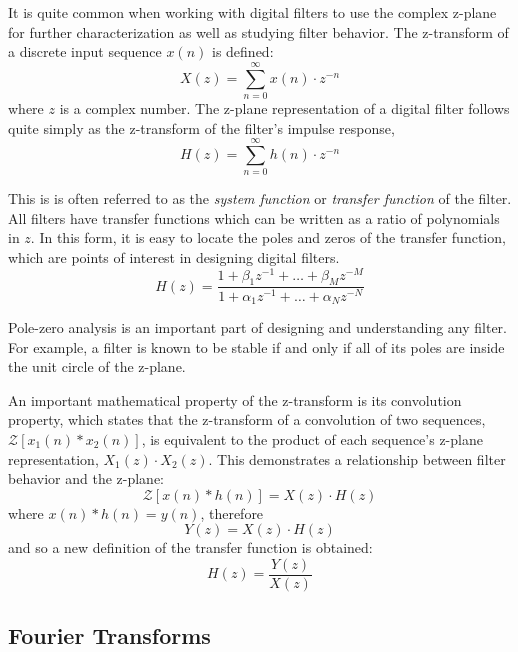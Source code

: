 \documentclass[reprint,amsmath,amssymb,aps,pra]{revtex4-2}
\begin{document}
It is quite common when working with digital filters to use the complex z-plane for further characterization as well as studying filter behavior. The z-transform of a discrete input sequence $x(n)$ is defined:
\begin{equation}
    X(z) = \sum_{n=0}^\infty x(n)\cdot z^{-n}
\end{equation}
where $z$ is a complex number. The z-plane representation of a digital filter follows quite simply as the z-transform of the filter's impulse response,
\begin{equation}
    H(z) = \sum_{n=0}^\infty h(n)\cdot z^{-n}
\end{equation}

This is is often referred to as the \textit{system function} or \textit{transfer function} of the filter. All filters have transfer functions which can be written as a ratio of polynomials in $z$. In this form, it is easy to locate the poles and zeros of the transfer function, which are points of interest in designing digital filters.
\begin{equation}
    H(z) = \frac{1+\beta_1z^{-1} + \ldots + \beta_Mz^{-M}}{1+\alpha_1z^{-1} + \ldots + \alpha_Nz^{-N}}
\end{equation}

Pole-zero analysis is an important part of designing and understanding any filter. For example, a filter is known to be stable if and only if all of its poles are inside the unit circle of the z-plane.

An important mathematical property of the z-transform is its convolution property, which states that the z-transform of a convolution of two sequences, $\mathcal{Z}\left[x_1(n)*x_2(n)\right]$, is equivalent to the product of each sequence's z-plane representation, $X_1(z)\cdot X_2(z)$. This demonstrates a relationship between filter behavior and the z-plane:
\begin{equation}
    \mathcal{Z}[x(n)*h(n)] = X(z)\cdot H(z) \nonumber
\end{equation}
where $x(n) * h(n) = y(n)$, therefore
\begin{equation}
    Y(z) = X(z) \cdot H(z) 
\end{equation}
and so a new definition of the transfer function is obtained:
\begin{equation}
    H(z) = \frac{Y(z)}{X(z)}
\end{equation}

\subsection{Fourier Transforms}
\end{document}
